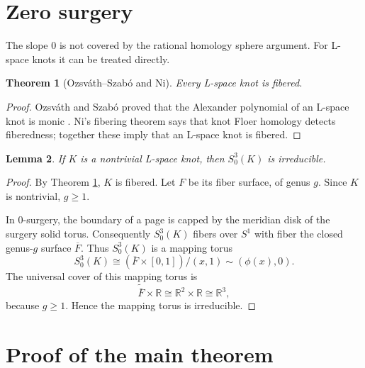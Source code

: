 \documentclass[11pt]{article}
\newtheorem{theorem}{Theorem}[section]
\newtheorem{lemma}[theorem]{Lemma}
\theoremstyle{definition}
\theoremstyle{remark}
\newcommand{\R}{\mathbb{R}}
\begin{document}
\section{Zero surgery}

The slope \(0\) is not covered by the rational homology sphere
argument.  For L-space knots it can be treated directly.

\begin{theorem}[Ozsv\'ath--Szab\'o and Ni]\label{thm:fibered}
Every L-space knot is fibered.
\end{theorem}

\begin{proof}
Ozsv\'ath and Szab\'o proved that the Alexander polynomial of an
L-space knot is monic \cite{OS05}.  Ni's fibering theorem
\cite{Ni07} says that knot Floer homology detects fiberedness;
together these imply that an L-space knot is fibered.
\end{proof}

\begin{lemma}\label{lem:zero}
If \(K\) is a nontrivial L-space knot, then \(S^3_0(K)\) is
irreducible.
\end{lemma}

\begin{proof}
By Theorem \ref{thm:fibered}, \(K\) is fibered.  Let \(F\) be its
fiber surface, of genus \(g\).  Since \(K\) is nontrivial, \(g\geq 1\).

In \(0\)-surgery, the boundary of a page is capped by the meridian
disk of the surgery solid torus.  Consequently \(S^3_0(K)\) fibers
over \(S^1\) with fiber the closed genus-\(g\) surface
\(\overline F\).  Thus \(S^3_0(K)\) is a mapping torus
\[
S^3_0(K)\cong
(\overline F\times [0,1])/(x,1)\sim(\phi(x),0).
\]
The universal cover of this mapping torus is
\[
\widetilde{\overline F}\times\R\cong \R^2\times\R\cong\R^3,
\]
because \(g\geq 1\).  Hence the mapping torus is irreducible.
\end{proof}

\section{Proof of the main theorem}
\end{document}
